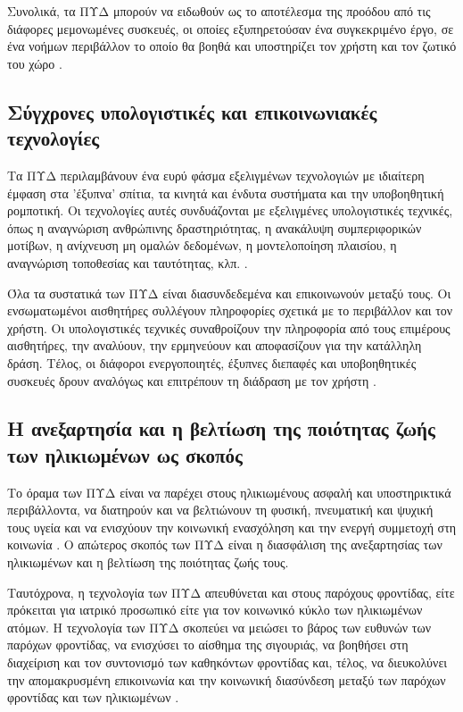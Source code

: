 Συνολικά, τα ΠΥΔ μπορούν να ειδωθούν ως το αποτέλεσμα της προόδου από τις διάφορες μεμονωμένες συσκευές, οι οποίες εξυπηρετούσαν ένα συγκεκριμένο έργο, σε ένα νοήμων περιβάλλον το οποίο θα βοηθά και υποστηρίζει τον χρήστη και τον ζωτικό του χώρο \cite{Blackman2016}.

\subsection{Σύγχρονες υπολογιστικές και επικοινωνιακές τεχνολογίες}
Τα ΠΥΔ περιλαμβάνουν ένα ευρύ φάσμα εξελιγμένων τεχνολογιών με ιδιαίτερη έμφαση στα 'έξυπνα' σπίτια, τα κινητά και ένδυτα συστήματα και την υποβοηθητική ρομποτική.\cite{rashidi2012survey}
Οι τεχνολογίες αυτές συνδυάζονται με εξελιγμένες υπολογιστικές τεχνικές, όπως η αναγνώριση ανθρώπινης δραστηριότητας, η ανακάλυψη συμπεριφορικών μοτίβων, η ανίχνευση μη ομαλών δεδομένων, η μοντελοποίηση πλαισίου, η αναγνώριση τοποθεσίας και ταυτότητας, κλπ. \cite{rashidi2012survey} \cite{Acampora2013}.
\par
Όλα τα συστατικά των ΠΥΔ είναι διασυνδεδεμένα και επικοινωνούν μεταξύ τους.
Οι ενσωματωμένοι αισθητήρες συλλέγουν πληροφορίες σχετικά με το περιβάλλον και τον χρήστη.
Οι υπολογιστικές τεχνικές συναθροίζουν την πληροφορία από τους επιμέρους αισθητήρες, την αναλύουν, την ερμηνεύουν και αποφασίζουν για την κατάλληλη δράση.
Τέλος, οι διάφοροι ενεργοποιητές, έξυπνες διεπαφές και υποβοηθητικές συσκευές δρουν αναλόγως και επιτρέπουν τη διάδραση με τον χρήστη \cite{broek}.
\subsection{Η ανεξαρτησία και η βελτίωση της ποιότητας ζωής των ηλικιωμένων ως σκοπός}
Το όραμα των ΠΥΔ είναι να παρέχει στους ηλικιωμένους ασφαλή και υποστηρικτικά περιβάλλοντα, να διατηρούν και να βελτιώνουν τη φυσική, πνευματική και ψυχική τους υγεία και να ενισχύουν την κοινωνική ενασχόληση και την ενεργή συμμετοχή στη κοινωνία \cite{Queiros2013}\cite{Blackman2016}\cite{broek}\cite{Peek2014}\cite{cardinaux}.
Ο απώτερος σκοπός των ΠΥΔ είναι η διασφάλιση της ανεξαρτησίας των ηλικιωμένων και η βελτίωση της ποιότητας ζωής τους.
\par
Ταυτόχρονα, η τεχνολογία των ΠΥΔ απευθύνεται και στους παρόχους φροντίδας, είτε πρόκειται για ιατρικό προσωπικό είτε για τον κοινωνικό κύκλο των ηλικιωμένων ατόμων.
Η τεχνολογία των ΠΥΔ σκοπεύει να μειώσει το βάρος των ευθυνών των παρόχων φροντίδας, να ενισχύσει το αίσθημα της σιγουριάς, να βοηθήσει στη διαχείριση και τον συντονισμό των καθηκόντων φροντίδας και, τέλος, να διευκολύνει την απομακρυσμένη επικοινωνία και την κοινωνική διασύνδεση μεταξύ των παρόχων φροντίδας και των ηλικιωμένων \cite{rashidi2012survey}\cite{Bossen2013}\cite{Cornejo2012}.
